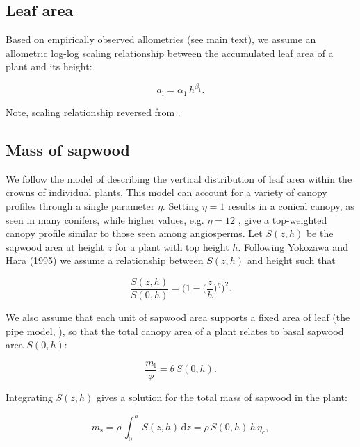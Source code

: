 \documentclass[12pt, a4paper]{article}
\begin{document}
\begin{appendices}
\subsection{Leaf area}\label{leaf-area}

Based on empirically observed allometries (see main text), we assume an
allometric log-log scaling relationship between the accumulated leaf
area of a plant and its height:

\begin{equation}\label{eq:ha}
a_\textrm{l}=\alpha_1 \, h^{\beta_1}.
\end{equation}

Note, scaling relationship reversed from \citep{falster-2011}.

\subsection{Mass of sapwood}\label{mass-of-sapwood}

We follow the model of \citep{yokozawa-1995} describing the
vertical distribution of leaf area within the crowns of individual
plants. This model can account for a variety of canopy profiles through
a single parameter $\eta$. Setting $\eta=1$ results in a conical
canopy, as seen in many conifers, while higher values, e.g. $\eta=12$
, give a top-weighted canopy profile similar to those seen among
angiosperms. Let $S(z,h)$ be the sapwood area at height $z$ for a
plant with top height $h$. Following Yokozawa and Hara (1995) we
assume a relationship between $S(z,h)$ and height such that

\begin{equation}\label{eq:crown1}
\frac{S(z,h)}{S(0,h)}= \big(1-\big(\frac{z}{h}\big)^\eta\big)^2.
\end{equation}

We also assume that each unit of sapwood area supports a fixed area of
leaf (the pipe model, \citep{shinozaki-1964}), so that the total
canopy area of a plant relates to basal sapwood area $S(0,h)$:

\begin{equation}\label{eq:crown2}
\frac{m_\textrm{l}}{\phi}= \theta \, S(0,h).
\end{equation}

Integrating $S(z,h)$ gives a solution for the total mass of sapwood in
the plant:

\begin{equation}\label{eq:ms1}
m_\textrm{s}=\rho \, \int_0^h \, S(z,h) \, \textrm{d}z= \rho \, S(0,h) \, h \, \eta_c, \end{equation}


\end{appendices}
\end{document}
